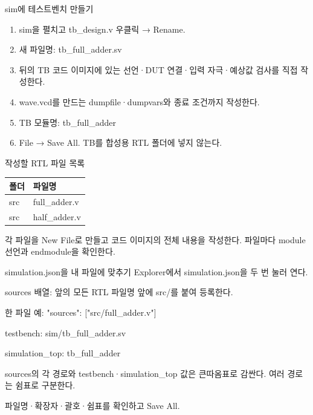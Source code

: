 \begin{frame}{sim에 테스트벤치 만들기}\relax
\small
\begin{enumerate}\setlength{\itemsep}{0.22cm}
\item sim을 펼치고 tb\_design.v 우클릭 → Rename.
\item 새 파일명: tb\_full\_adder.sv
\item 뒤의 TB 코드 이미지에 있는 선언·DUT 연결·입력 자극·예상값 검사를 직접 작성한다.
\item wave.vcd를 만드는 dumpfile·dumpvars와 종료 조건까지 작성한다.
\item TB 모듈명: tb\_full\_adder
\item File → Save All. TB를 합성용 RTL 폴더에 넣지 않는다.
\end{enumerate}

\end{frame}

\begin{frame}{작성할 RTL 파일 목록}\relax
\small
\begin{center}\renewcommand{\arraystretch}{1.45}
\begin{tabular}{l|l}
폴더 & 파일명\\\hline
src & full\_adder.v\\
src & half\_adder.v\\
\end{tabular}\end{center}
각 파일을 New File로 만들고 코드 이미지의 전체 내용을 작성한다. 파일마다 module 선언과 endmodule을 확인한다.\par
\end{frame}

\begin{frame}{simulation.json을 내 파일에 맞추기}\relax
\small
Explorer에서 simulation.json을 두 번 눌러 연다.\par\vspace{0.22cm}sources 배열: 앞의 모든 RTL 파일명 앞에 src/를 붙여 등록한다.\par\vspace{0.22cm}한 파일 예: "sources": ["src/full\_adder.v"]\par\vspace{0.22cm}testbench: sim/tb\_full\_adder.sv\par\vspace{0.22cm}simulation\_top: tb\_full\_adder\par\vspace{0.22cm}sources의 각 경로와 testbench·simulation\_top 값은 큰따옴표로 감싼다. 여러 경로는 쉼표로 구분한다.\par\vspace{0.22cm}파일명·확장자·괄호·쉼표를 확인하고 Save All.\par
\end{frame}

